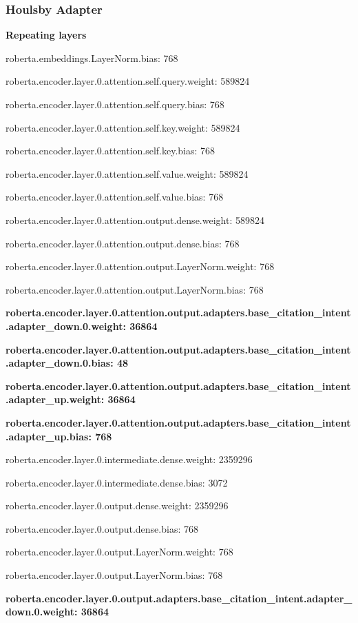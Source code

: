 \documentclass[10pt,twocolumn,letterpaper]{article}
\begin{document}
\subsubsection{Houlsby Adapter}
\label{sec:houlsbymodel} 

\textbf{Repeating layers}

roberta.embeddings.LayerNorm.bias: 768

roberta.encoder.layer.0.attention.self.query.weight: 589824

roberta.encoder.layer.0.attention.self.query.bias: 768

roberta.encoder.layer.0.attention.self.key.weight: 589824

roberta.encoder.layer.0.attention.self.key.bias: 768

roberta.encoder.layer.0.attention.self.value.weight: 589824

roberta.encoder.layer.0.attention.self.value.bias: 768

roberta.encoder.layer.0.attention.output.dense.weight: 589824

roberta.encoder.layer.0.attention.output.dense.bias: 768

roberta.encoder.layer.0.attention.output.LayerNorm.weight: 768

roberta.encoder.layer.0.attention.output.LayerNorm.bias: 768

\textbf{roberta.encoder.layer.0.attention.output.adapters.base\_citation\_intent.adapter\_down.0.weight: 36864}

\textbf{roberta.encoder.layer.0.attention.output.adapters.base\_citation\_intent.adapter\_down.0.bias: 48}

\textbf{roberta.encoder.layer.0.attention.output.adapters.base\_citation\_intent.adapter\_up.weight: 36864}

\textbf{roberta.encoder.layer.0.attention.output.adapters.base\_citation\_intent.adapter\_up.bias: 768}

roberta.encoder.layer.0.intermediate.dense.weight: 2359296

roberta.encoder.layer.0.intermediate.dense.bias: 3072

roberta.encoder.layer.0.output.dense.weight: 2359296

roberta.encoder.layer.0.output.dense.bias: 768

roberta.encoder.layer.0.output.LayerNorm.weight: 768

roberta.encoder.layer.0.output.LayerNorm.bias: 768

\textbf{roberta.encoder.layer.0.output.adapters.base\_citation\_intent.adapter\_down.0.weight: 36864}
\end{document}
